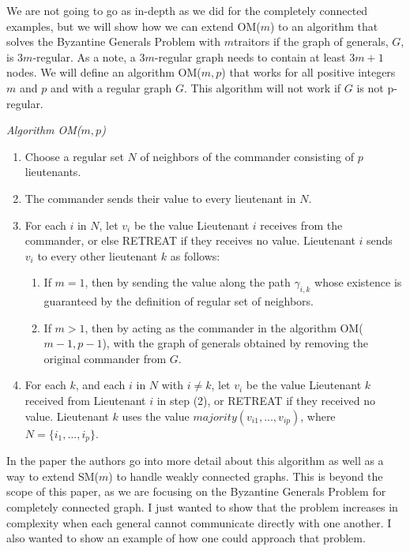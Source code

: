 \documentclass[10pt]{amsart}
\begin{document}
We are not going to go as in-depth as we did for the completely connected examples, but we will show
how we can extend OM($m$) to an algorithm that solves the Byzantine Generals Problem with $m $traitors
if the graph of generals, $G$, is $3m$-regular. As a note, a $3m$-regular graph needs to contain at least
$3m+1$ nodes. We will define an algorithm OM($m,p$) that works for all positive integers $m$ and $p$ and with
a regular graph $G$. This algorithm will not work if $G$ is not p-regular.

\noindent\emph{Algorithm OM($m,p$)} \\
\vspace{-10pt}
\begin{enumerate}[label=\arabic{enumi}.]
    \item Choose a regular set $N$ of neighbors of the commander consisting of $p$ lieutenants.
    \item The commander sends their value to every lieutenant in $N$.
    \item {
        For each $i$ in $N$, let $v_i$ be the value Lieutenant $i$ receives from the commander, or else
        RETREAT if they receives no value. Lieutenant $i$ sends $v_i$ to every other lieutenant $k$ as follows:
        \begin{enumerate}[label={\alph*.}]
               \item {
                    If $m = 1$, then by sending the value along the path $\gamma_{i,k}$ whose existence 
                    is guaranteed by the definition of regular set of neighbors.
            }
            \item {
                    If $m>1$, then by acting as the commander in the algorithm OM($m-1, p-1$), with the 
                    graph of generals obtained by removing the original commander from $G$.
            }
        \end{enumerate}
    }
    \item {
        For each $k$, and each $i$ in $N$ with $i \neq k$, let $v_i$ be the value Lieutenant $k$ received from
        Lieutenant $i$ in step (2), or RETREAT if they received no value. Lieutenant $k$ uses the value
        $majority(v_{i1},...,v_{ip})$, where $N = \{i_1,...,i_p\}$.
    }
\end{enumerate}

In the paper the authors go into more detail about this algorithm as well as a way to extend SM($m$)
to handle weakly connected graphs. This is beyond the scope of this paper, as we are focusing on
the Byzantine Generals Problem for completely connected graph. I just wanted to show that the problem
increases in complexity when each general cannot communicate directly with one another. I also wanted
to show an example of how one could approach that problem.
\end{document}
